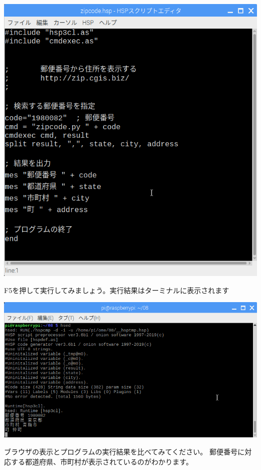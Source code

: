 \documentclass[a4paper,12pt,dvipdfmx]{jarticle}
\begin{document}
\begin{center}
\includegraphics[width=13.951cm]{textbook-img056.png}

\end{center}

\bigskip

\clearpage
F5を押して実行してみましょう。実行結果はターミナルに表示されます



\begin{center}
\includegraphics[width=17.006cm]{textbook-img057.png}

\end{center}
ブラウザの表示とプログラムの実行結果を比べてみてください。
郵便番号に対応する都道府県、市町村が表示されているのがわかります。
\end{document}
